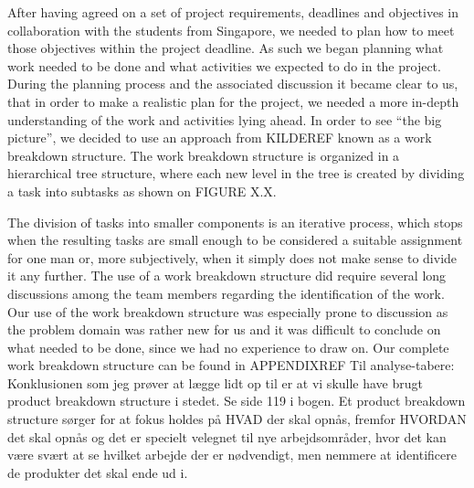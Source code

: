 After having agreed on a set of project requirements, deadlines and objectives in collaboration with the students from Singapore, we needed to plan how to meet those objectives within the project deadline. As such we began planning what work needed to be done and what activities we expected to do in the project.
During the planning process and the associated discussion it became clear to us, that in order to make a realistic plan for the project, we needed a more in-depth understanding of the work and activities lying ahead. In order to see “the big picture”, we decided to use an approach from KILDEREF known as a work breakdown structure. The work breakdown structure is organized in a hierarchical tree structure, where each new level in the tree is created by dividing a task into subtasks as shown on FIGURE X.X.
 
The division of tasks into smaller components is an iterative process, which stops when the resulting tasks are small enough to be considered a suitable assignment for one man or, more subjectively, when it simply does not make sense to divide it any further.
The use of a work breakdown structure did require several long discussions among the team members regarding the identification of the work. Our use of the work breakdown structure was especially prone to discussion as the problem domain was rather new for us and it was difficult to conclude on what needed to be done, since we had no experience to draw on.
Our complete work breakdown structure can be found in APPENDIXREF
Til analyse-tabere:
Konklusionen som jeg prøver at lægge lidt op til er at vi skulle have brugt product breakdown structure i stedet. Se side 119 i bogen.
Et product breakdown structure sørger for at fokus holdes på HVAD der skal opnås, fremfor HVORDAN det skal opnås og det er specielt velegnet til nye arbejdsområder, hvor det kan være svært at se hvilket arbejde der er nødvendigt, men nemmere at identificere de produkter det skal ende ud i.
